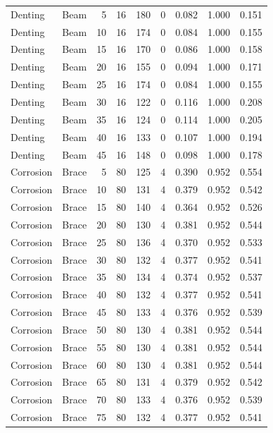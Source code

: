 \begin{table}[H]
\begin{tabular}{llrrrrrrr}
    Denting & Beam & 5 & 16 & 180 & 0 & 0.082 & 1.000 & 0.151 \\
    Denting & Beam & 10 & 16 & 174 & 0 & 0.084 & 1.000 & 0.155 \\
    Denting & Beam & 15 & 16 & 170 & 0 & 0.086 & 1.000 & 0.158 \\
    Denting & Beam & 20 & 16 & 155 & 0 & 0.094 & 1.000 & 0.171 \\
    Denting & Beam & 25 & 16 & 174 & 0 & 0.084 & 1.000 & 0.155 \\
    Denting & Beam & 30 & 16 & 122 & 0 & 0.116 & 1.000 & 0.208 \\
    Denting & Beam & 35 & 16 & 124 & 0 & 0.114 & 1.000 & 0.205 \\
    Denting & Beam & 40 & 16 & 133 & 0 & 0.107 & 1.000 & 0.194 \\
    Denting & Beam & 45 & 16 & 148 & 0 & 0.098 & 1.000 & 0.178 \\
    \midrule
    Corrosion & Brace & 5 & 80 & 125 & 4 & 0.390 & 0.952 & 0.554 \\
    Corrosion & Brace & 10 & 80 & 131 & 4 & 0.379 & 0.952 & 0.542 \\
    Corrosion & Brace & 15 & 80 & 140 & 4 & 0.364 & 0.952 & 0.526 \\
    Corrosion & Brace & 20 & 80 & 130 & 4 & 0.381 & 0.952 & 0.544 \\
    Corrosion & Brace & 25 & 80 & 136 & 4 & 0.370 & 0.952 & 0.533 \\
    Corrosion & Brace & 30 & 80 & 132 & 4 & 0.377 & 0.952 & 0.541 \\
    Corrosion & Brace & 35 & 80 & 134 & 4 & 0.374 & 0.952 & 0.537 \\
    Corrosion & Brace & 40 & 80 & 132 & 4 & 0.377 & 0.952 & 0.541 \\
    Corrosion & Brace & 45 & 80 & 133 & 4 & 0.376 & 0.952 & 0.539 \\
    Corrosion & Brace & 50 & 80 & 130 & 4 & 0.381 & 0.952 & 0.544 \\
    Corrosion & Brace & 55 & 80 & 130 & 4 & 0.381 & 0.952 & 0.544 \\
    Corrosion & Brace & 60 & 80 & 130 & 4 & 0.381 & 0.952 & 0.544 \\
    Corrosion & Brace & 65 & 80 & 131 & 4 & 0.379 & 0.952 & 0.542 \\
    Corrosion & Brace & 70 & 80 & 133 & 4 & 0.376 & 0.952 & 0.539 \\
    Corrosion & Brace & 75 & 80 & 132 & 4 & 0.377 & 0.952 & 0.541 \\

\end{tabular}
\end{table}
